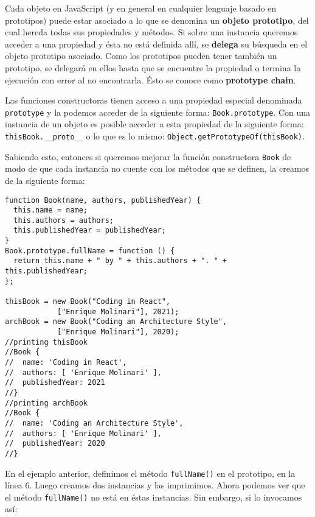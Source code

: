 \documentclass[a4paper, oneside, titlepage, 12pt]{paper}
\begin{document}
Cada objeto en JavaScript (y en general en cualquier lenguaje basado en prototipos) puede estar asociado a lo que se denomina un \textbf{objeto prototipo}, del cual hereda todas sus propiedades y métodos. Si sobre una instancia queremos acceder a una propiedad y ésta no está definida allí, se \textbf{delega} su búsqueda en el objeto prototipo asociado. Como los prototipos pueden tener también un prototipo, se delegará en ellos hasta que se encuentre la propiedad o termina la ejecución con error al no encontrarla. Ésto se conoce como \textbf{prototype chain}.
\newline

Las funciones constructoras tienen acceso a una propiedad especial denominada \texttt{prototype} y la podemos acceder de la siguiente forma: \texttt{Book.prototype}. Con una instancia de un objeto es posible acceder a esta propiedad de la siguiente forma: \texttt{thisBook.__proto__} o lo que es lo mismo: \texttt{Object.getPrototypeOf(thisBook)}. 
\newline

Sabiendo esto, entonces si queremos mejorar la función constructora \texttt{Book} de modo de que cada instancia no cuente con los métodos que se definen, la creamos de la siguiente forma:

\begin{verbatim}
function Book(name, authors, publishedYear) {
  this.name = name;
  this.authors = authors;
  this.publishedYear = publishedYear;
}
Book.prototype.fullName = function () {
  return this.name + " by " + this.authors + ". " + this.publishedYear;
};               
               
thisBook = new Book("Coding in React", 
			["Enrique Molinari"], 2021);
archBook = new Book("Coding an Architecture Style", 
			["Enrique Molinari"], 2020);
//printing thisBook
//Book {
//  name: 'Coding in React',
//  authors: [ 'Enrique Molinari' ],
//  publishedYear: 2021
//}
//printing archBook
//Book {
//  name: 'Coding an Architecture Style',
//  authors: [ 'Enrique Molinari' ],
//  publishedYear: 2020
//}
\end{verbatim}

En el ejemplo anterior, definimos el método \texttt{fullName()} en el prototipo, en la línea 6. Luego creamos dos instancias y las imprimimos. Ahora podemos ver que el método \texttt{fullName()} no está en éstas instancias. Sin embargo, si lo invocamos así:
\end{document}
